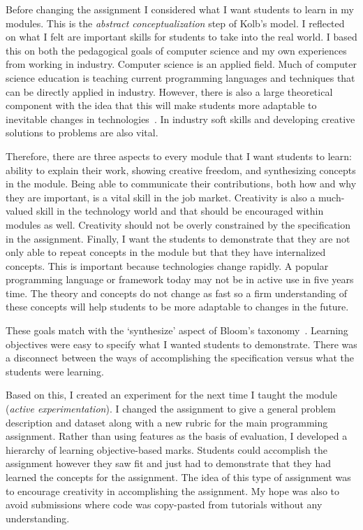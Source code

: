 \documentclass[
]{article}
\begin{document}
Before changing the assignment I considered what I want students to
learn in my modules. This is the \emph{abstract conceptualization} step
of Kolb's model. I reflected on what I felt are important skills for
students to take into the real world. I based this on both the
pedagogical goals of computer science and my own experiences from
working in industry. Computer science is an applied field. Much of
computer science education is teaching current programming languages and
techniques that can be directly applied in industry. However, there is
also a large theoretical component with the idea that this will make
students more adaptable to inevitable changes in technologies~\cite{lethbridge:2000}.
In industry soft skills and developing creative solutions to problems
are also vital.

Therefore, there are three aspects to every module that I want students
to learn: ability to explain their work, showing creative freedom, and
synthesizing concepts in the module. Being able to communicate their
contributions, both how and why they are important, is a vital skill in
the job market. Creativity is also a much-valued skill in the technology
world and that should be encouraged within modules as well. Creativity
should not be overly constrained by the specification in the assignment.
Finally, I want the students to demonstrate that they are not only able
to repeat concepts in the module but that they have internalized
concepts. This is important because technologies change rapidly. A
popular programming language or framework today may not be in active use
in five years time. The theory and concepts do not change as fast so a
firm understanding of these concepts will help students to be more
adaptable to changes in the future.

These goals match with the `synthesize' aspect of Bloom's
taxonomy~\cite{bloom:1956}. Learning objectives were easy to specify what I
wanted students to demonstrate. There was a disconnect between the ways
of accomplishing the specification versus what the students were
learning.

Based on this, I created an experiment for the next time I taught the
module (\emph{active experimentation}). I changed the assignment to give
a general problem description and dataset along with a new rubric for
the main programming assignment. Rather than using features as the basis
of evaluation, I developed a hierarchy of learning objective-based
marks. Students could accomplish the assignment however they saw fit and
just had to demonstrate that they had learned the concepts for the
assignment. The idea of this type of assignment was to encourage
creativity in accomplishing the assignment. My hope was also to avoid
submissions where code was copy-pasted from tutorials without any
understanding.
\end{document}
